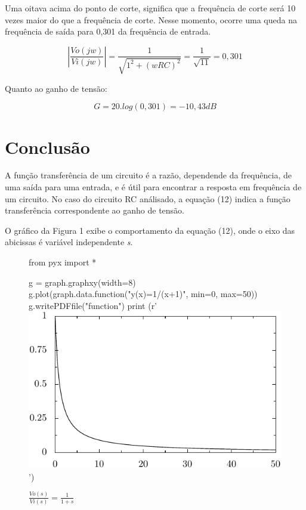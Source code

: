 \documentclass[12pt]{article}
\begin{document}
Uma oitava acima do ponto de corte, significa que a frequência de corte será 10 vezes maior do que a frequência de corte. Nesse momento, ocorre uma queda na frequência de saída para 0,301 da frequência de entrada.  


\begin{equation}
\left|\frac{Vo(jw)}{Vi(jw)} \right| = \frac{1}{\sqrt{1^2+(wRC)^2}} = \frac{1}{\sqrt{11}} = 0,301
\end{equation}

Quanto ao ganho de tensão:

\begin{equation}
G = 20.log(0,301) = -10,43dB
\end{equation}


\section{Conclusão}
A função transferência de um circuito é a razão, dependende da frequência, de uma saída para uma entrada, e é útil para encontrar a resposta em frequência de um circuito. No caso do circuito RC análisado, a equação (12) indica a função transferência correspondente ao ganho de tensão.

O gráfico da Figura 1 exibe o comportamento da equação (12), onde o eixo das abicissas é variável independente  \textit{s}. 

\begin{figure}[h]
\centering
\begin{pycode}

from pyx import *

g = graph.graphxy(width=8)
g.plot(graph.data.function("y(x)=1/(x+1)", min=0, max=50))
g.writePDFfile("function")
print (r'\includegraphics{function}')
\end{pycode}
\caption{$\frac{Vo(s)}{Vi(s)}=$$\frac{1}{1+s}$}
\end{figure}
\end{document}
